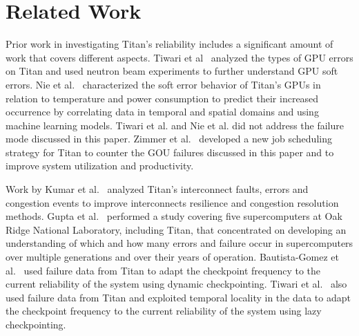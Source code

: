 \section{Related Work}
\label{sec:related}

Prior work in investigating Titan's reliability includes a significant amount of work that covers different aspects.
%
Tiwari et al~\cite{7056044} analyzed the types of GPU errors on Titan and used neutron beam experiments to further understand GPU soft errors.
%
Nie et al.~\cite{nie17characterizing,nie18machine} characterized the soft error behavior of Titan's GPUs in relation to temperature and power consumption to predict their increased occurrence by correlating data in temporal and spatial domains and using machine learning models.
%
Tiwari et al. and Nie et al. did not address the failure mode discussed in this paper.
%
Zimmer et al.~\cite{8665764} developed a new job scheduling strategy for Titan to counter the GOU failures discussed in this paper and to improve system utilization and productivity.


Work by Kumar et al.~\cite{kumar18understanding} analyzed Titan's interconnect faults, errors and congestion events to improve interconnects resilience and congestion resolution methods.
%
Gupta et al.~\cite{gupta17failures} performed a study covering five supercomputers at Oak Ridge National Laboratory, including Titan, that concentrated on developing an understanding of which and how many errors and failure occur in supercomputers over multiple generations and over their years of operation.
%
Bautista-Gomez et al.~\cite{bautista-gomez16reducing} used failure data from Titan to adapt the checkpoint frequency to the current reliability of the system using dynamic checkpointing.
%
Tiwari et al.~\cite{6903564} also used failure data from Titan and exploited temporal locality in the data to adapt the checkpoint frequency to the current reliability of the system using lazy checkpointing.